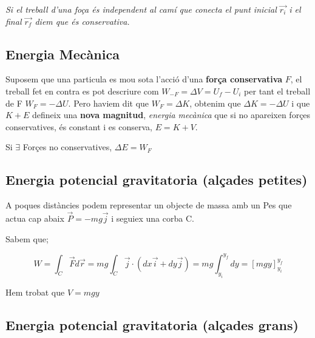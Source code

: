 \documentclass[12pt]{article}
\newcommand{\axes}[4]{%
  \draw[ax] (0,0) -- (#1,0) node[right, black] {#3};
  \draw[ax] (0,0) -- (0,#2) node[above, black] {#4};}
\begin{document}
\textit{Si el treball d'una foça és independent al camí que conecta el punt inicial $\vec{r_i}$ i el final $\vec{r_f}$ diem que és conservativa.}

\subsection{Energia Mecànica}

Suposem que una particula es mou sota l'acció d'una \textbf{força conservativa} $F$, el treball fet en contra es pot descriure com $W_{-F}= \Delta V = U_f-U_i$ per tant el treball de F $W_F = -\Delta U$. Pero haviem dit que $W_F = \Delta K$, obtenim que $\Delta K = - \Delta U$ i que $K+ E$ defineix una \textbf{nova magnitud}, \textit{energia mecànica} que si no apareixen forçes conservatives, és constant i es conserva, $\boxed{E = K + V}$.

Si $\exists$ Forçes no conservatives, $\Delta E = W_F$

\subsection{Energia potencial gravitatoria (alçades petites)}

A poques distàncies podem representar un objecte de massa amb un Pes que actua cap abaix $\vec{P} = -mg\vec{j}$ i seguiex una corba C.

\begin{center}
\end{center}

Sabem que;

\[W = \int_C \vec{F} d\vec{r} = mg \int_C \vec{j} \cdot (dx \vec{i} + dy \vec{j}) = mg \int_{y_i}^{y_f} dy = [mgy]^{y_f}_{y_i}\]

Hem trobat que $V = mgy$

\subsection{Energia potencial gravitatoria (alçades grans)}
\end{document}
